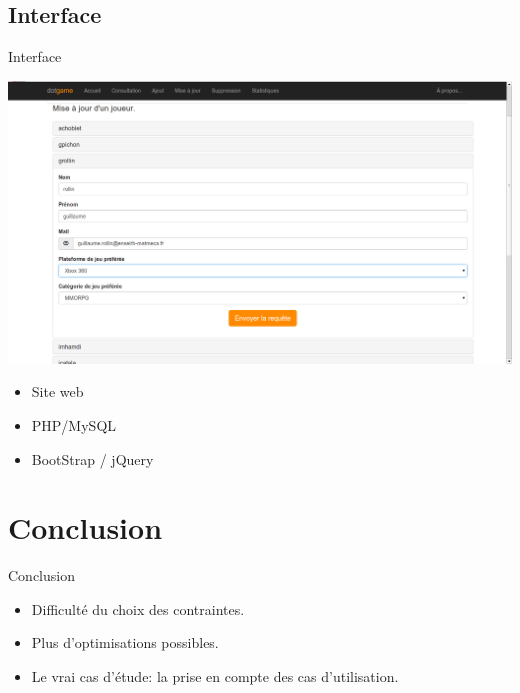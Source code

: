 \documentclass{beamer}
\begin{document}
\subsection{Interface}
\begin{frame}
\begin{block}{Interface}
\begin{center}
\includegraphics[scale=0.20]{capture2.png}
\end{center}
\begin{itemize}
\item Site web
\item PHP/MySQL
\item BootStrap / jQuery
\end{itemize}
\end{block}
\end{frame}

\section*{Conclusion}
\begin{frame}
\begin{block}{Conclusion}
\begin{center}
\begin{itemize}
\item Difficulté du choix des contraintes.
\item Plus d'optimisations possibles.
\item Le vrai cas d'étude: la prise en compte des cas d'utilisation.
\end{itemize}
\end{center}
\end{block}
\end{frame}
\end{document}

